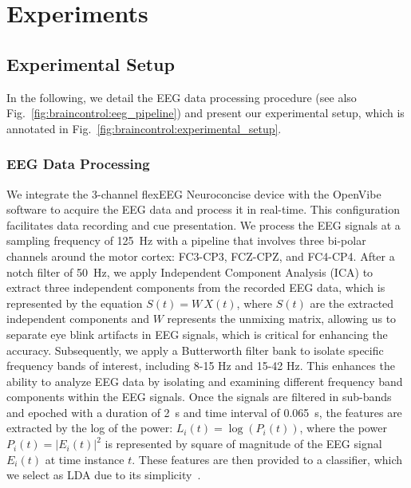 \section{Experiments}

\subsection{Experimental Setup}
In the following, we detail the \gls{EEG} data processing procedure (see also Fig.~\ref{fig:braincontrol:eeg_pipeline}) and present our experimental setup, which is annotated in Fig.~\ref{fig:braincontrol:experimental_setup}.

\subsubsection{EEG Data Processing}\label{ssub:braincontrol:eeg_pipeline}
We integrate the 3-channel flexEEG Neuroconcise device with the OpenVibe software
to acquire the EEG data and process it in real-time.
This configuration facilitates data recording and cue presentation. We process the \gls{EEG} signals at a sampling frequency of \SI{125}{Hz} with a pipeline that involves three bi-polar channels around the motor cortex: FC3-CP3, FCZ-CPZ, and FC4-CP4.
After a notch filter of \SI{50}{Hz}, we apply Independent Component Analysis (ICA) to extract three independent components from the recorded \gls{EEG} data, which is represented by the equation $S(t) = W \, X(t)$, where $S(t)$ are the extracted independent components and $W$ represents the unmixing matrix, allowing us to separate eye blink artifacts in \gls{EEG} signals, which is critical for enhancing the accuracy. 
Subsequently, we apply a Butterworth filter bank to isolate specific frequency bands of interest, including 8-15 \si{Hz} and 15-42 \si{Hz}. 
This enhances the ability to analyze \gls{EEG} data by isolating and examining different frequency band components within the \gls{EEG} signals. Once the signals are filtered in sub-bands and epoched with a duration of \SI{2}{s} and time interval of \SI{0.065}{s}, the features are extracted by the log of the power: $L_i(t) = \log\left(P_i(t)\right)$, where the power $P_i(t) = |E_i(t)|^2$ is represented by square of magnitude of the \gls{EEG} signal $E_i(t)$ at time instance $t$.
These features are then provided to a classifier, which we select as \gls{LDA} due to its simplicity~\citep{lotte2014tutorial}.

